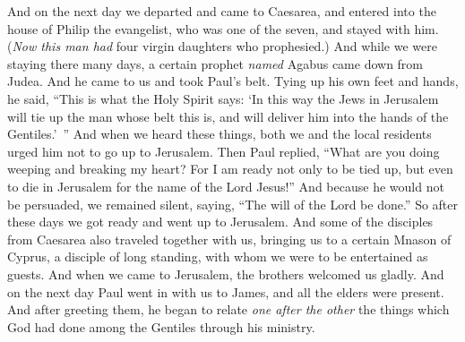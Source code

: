 \begin{biblechapter}
\verse And on the next day we departed and came to Caesarea, and entered into the house of Philip the evangelist, who was one of the seven, and stayed with him.
\verse (\textit{Now this man had} four virgin daughters who prophesied.)
\verse And while we were staying there many days, a certain prophet \textit{named} Agabus came down from Judea.
\verse And he came to us and took Paul’s belt. Tying up his own feet and hands, he said, “This is what the Holy Spirit says: ‘In this way the Jews in Jerusalem will tie up the man whose belt this is, and will deliver him into the hands of the Gentiles.’ ”
\verse And when we heard these things, both we and the local residents urged him not to go up to Jerusalem.
\verse Then Paul replied, “What are you doing weeping and breaking my heart? For I am ready not only to be tied up, but even to die in Jerusalem for the name of the Lord Jesus!”
\verse And because he would not be persuaded, we remained silent, saying, “The will of the Lord be done.”
\verse So after these days we got ready and went up to Jerusalem.
\verse And some of the disciples from Caesarea also traveled together with us, bringing us to a certain Mnason of Cyprus, a disciple of long standing, with whom we were to be entertained as guests.
 And when we came to Jerusalem, the brothers welcomed us gladly.
\verse And on the next day Paul went in with us to James, and all the elders were present.
\verse And after greeting them, he began to relate \textit{one after the other} the things which God had done among the Gentiles through his ministry.

\end{biblechapter}
